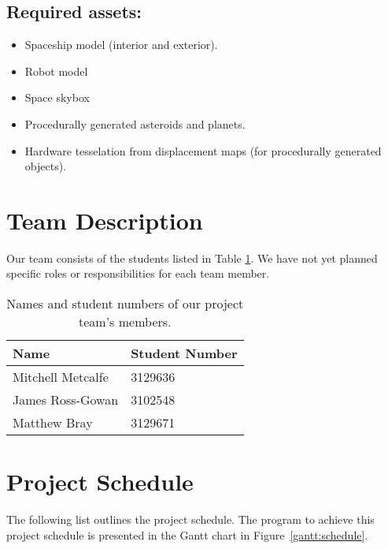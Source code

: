 \documentclass[11pt]{scrartcl} %
\begin{document}
    \subsection*{Required assets:}
    \begin{itemize}
        \item Spaceship model (interior and exterior).
        \item Robot model
        \item Space skybox
        \item Procedurally generated asteroids and planets.
        \item Hardware tesselation from displacement maps (for procedurally generated objects).
    \end{itemize}

\section*{Team Description}
    Our team consists of the students listed in Table \ref{table:teamMembers}.
    We have not yet planned specific roles or responsibilities for each team
    member.

    \begin{table}[h]
    \centering
        \begin{tabular}{@{}ll@{}}
        \toprule
            Name              & Student Number \\
        \midrule
            Mitchell Metcalfe & 3129636        \\
            James Ross-Gowan  & 3102548        \\
            Matthew Bray      & 3129671        \\
        \bottomrule
        \end{tabular}
        \caption[Team members]{Names and student numbers of our project team's members.}
        \label{table:teamMembers}
    \end{table}

\section*{Project Schedule}

The following list outlines the project schedule. The program to achieve this
project schedule is presented in the Gantt chart in
Figure~\ref{gantt:schedule}.
\end{document}
